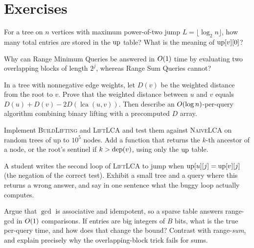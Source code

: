 \section{Exercises}
\label{ch23:exercises}

\begin{exercise}
For a tree on $n$ vertices with maximum power-of-two jump $L = \lfloor\log_2 n\rfloor$, how many total entries are stored in the $\mathrm{up}$ table? What is the meaning of $\mathrm{up}[v][0]$?
\end{exercise}

\begin{exercise}
Why can Range Minimum Queries be answered in $O(1)$ time by evaluating two overlapping blocks of length $2^j$, whereas Range Sum Queries cannot?
\end{exercise}

\begin{exercise}
\label{ch23:ex-distance}
In a tree with nonnegative edge weights, let $D(v)$ be the weighted distance from the root to
$v$. Prove that the weighted distance between $u$ and $v$ equals
$D(u)+D(v)-2D(\operatorname{lca}(u,v))$. Then describe an $O(\log n)$-per-query algorithm
combining binary lifting with a precomputed $D$ array.
\end{exercise}

\begin{exercise}
\label{ch23:ex-impl-lift}
Implement \textsc{BuildLifting} and \textsc{LiftLCA} and test them against \textsc{NaiveLCA}
on random trees of up to $10^5$ nodes. Add a function that returns the $k$-th ancestor of a
node, or the root's sentinel if $k>\operatorname{dep}(v)$, using only the $\mathrm{up}$ table.
\end{exercise}

\begin{exercise}
\label{ch23:ex-break}
A student writes the second loop of \textsc{LiftLCA} to jump when $\mathrm{up}[u][j]=\mathrm{up}[v][j]$ (the
negation of the correct test). Exhibit a small tree and a query where this returns a wrong
answer, and say in one sentence what the buggy loop actually computes.
\end{exercise}

\begin{exercise}
\label{ch23:ex-gcd}
Argue that $\gcd$ is associative and idempotent, so a sparse table answers range-gcd in
$O(1)$ comparisons. If entries are big integers of $B$ bits, what is the true per-query
time, and how does that change the bound? Contrast with range-\emph{sum}, and explain
precisely why the overlapping-block trick fails for sums.
\end{exercise}


